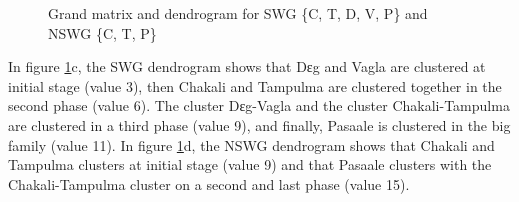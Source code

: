 \begin{figure}[htb]

\centering

\qquad
{}
\qquad
{}
\qquad
{}

\caption[Grand matrix and dendrogram for SWG  and NSWG]{Grand matrix and
dendrogram for SWG \{C, T, D, V, P\} and NSWG
\{C, T, P\}  \label{fig:NUM-align-quant-grand}}
\end{figure}


In figure \ref{fig:NUM-align-quant-grand}c,  the SWG  dendrogram shows that  
Dɛg
and Vagla are clustered at
initial stage (value 3), then Chakali and Tampulma are clustered together in the
second phase (value 6). The cluster  Dɛg-Vagla and the cluster
Chakali-Tampulma
are clustered in a third phase (value 9), and finally, Pasaale
is clustered in
the
big family (value 11).  In figure  \ref{fig:NUM-align-quant-grand}d, the NSWG 
dendrogram shows that Chakali and
Tampulma clusters at initial stage (value 9) and that Pasaale  clusters with
the Chakali-Tampulma cluster on a second and last phase (value 15).

